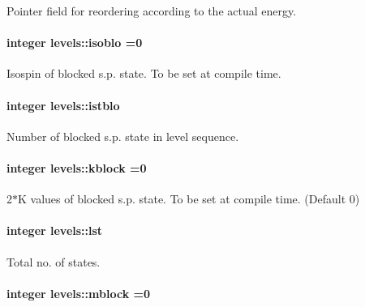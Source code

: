 Pointer field for reordering according to the actual energy. 

\paragraph[{\texorpdfstring{isoblo}{isoblo}}]{\setlength{\rightskip}{0pt plus 5cm}integer levels\+::isoblo =0}\hypertarget{namespacelevels_ae193d65da90e45d3e2d7238422a5bfba}{}\label{namespacelevels_ae193d65da90e45d3e2d7238422a5bfba}


Isospin of blocked s.\+p. state. To be set at compile time. 

\paragraph[{\texorpdfstring{istblo}{istblo}}]{\setlength{\rightskip}{0pt plus 5cm}integer levels\+::istblo}\hypertarget{namespacelevels_ad997f1af1ed619df7972aea27654aed0}{}\label{namespacelevels_ad997f1af1ed619df7972aea27654aed0}


Number of blocked s.\+p. state in level sequence. 

\paragraph[{\texorpdfstring{kblock}{kblock}}]{\setlength{\rightskip}{0pt plus 5cm}integer levels\+::kblock =0}\hypertarget{namespacelevels_a4f8198007cbc95b2fb23ebf1d1f1c118}{}\label{namespacelevels_a4f8198007cbc95b2fb23ebf1d1f1c118}


2$\ast$K values of blocked s.\+p. state. To be set at compile time. (Default 0) 

\paragraph[{\texorpdfstring{lst}{lst}}]{\setlength{\rightskip}{0pt plus 5cm}integer levels\+::lst}\hypertarget{namespacelevels_a79dde0705e3ca458744bc90ffe752e66}{}\label{namespacelevels_a79dde0705e3ca458744bc90ffe752e66}


Total no. of states. 

\paragraph[{\texorpdfstring{mblock}{mblock}}]{\setlength{\rightskip}{0pt plus 5cm}integer levels\+::mblock =0}\hypertarget{namespacelevels_a4ccc9103e54f31bb0cab356aa6beddb1}{}\label{namespacelevels_a4ccc9103e54f31bb0cab356aa6beddb1}


